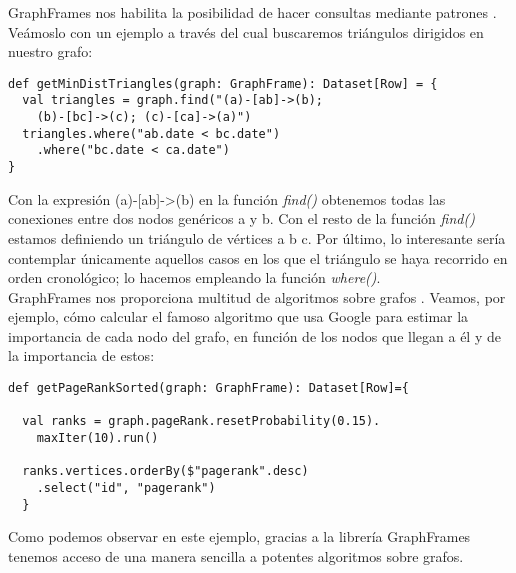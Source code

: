 GraphFrames nos habilita la posibilidad de hacer consultas mediante patrones \cite{motif}. Veámoslo con un ejemplo a través del cual buscaremos triángulos dirigidos en nuestro grafo:\\

\begin{lstlisting}[frame=single]
def getMinDistTriangles(graph: GraphFrame): Dataset[Row] = {
  val triangles = graph.find("(a)-[ab]->(b); 
  	(b)-[bc]->(c); (c)-[ca]->(a)")
  triangles.where("ab.date < bc.date")
  	.where("bc.date < ca.date")
}
\end{lstlisting}

Con la expresión (a)-[ab]->(b) en la función \textit{find()} obtenemos todas las conexiones entre dos nodos genéricos a y b. Con el resto de la función \textit{find()} estamos definiendo un triángulo de vértices a b c.  Por último, lo interesante sería contemplar únicamente aquellos casos en los que el triángulo se haya recorrido en orden cronológico; lo hacemos empleando la función \textit{where()}.\\

GraphFrames nos proporciona multitud de algoritmos sobre grafos \cite{graphFramesGuide}. Veamos, por ejemplo, cómo calcular el famoso algoritmo que usa Google \cite{pagerank} para estimar la importancia de cada nodo del grafo, en función de los nodos que llegan a él y de la importancia de estos:\\

\begin{lstlisting}[frame=single]
def getPageRankSorted(graph: GraphFrame): Dataset[Row]={

  val ranks = graph.pageRank.resetProbability(0.15).
  	maxIter(10).run()

  ranks.vertices.orderBy($"pagerank".desc)
	.select("id", "pagerank")
  }
\end{lstlisting}

Como podemos observar en este ejemplo, gracias a la librería GraphFrames tenemos acceso de una manera sencilla a potentes algoritmos sobre grafos.\\
